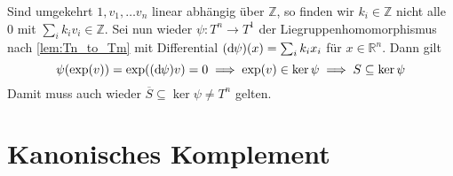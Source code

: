 \begin{beweis}
\begin{enumerate}[(i)]
		Sind umgekehrt $1, v_1, \ldots v_n$ linear abhängig über $\mathbb{Z}$, so finden wir $k_i \in \mathbb{Z}$ nicht alle $0$ mit $\sum_i k_i v_i \in \mathbb{Z}$.
		Sei nun wieder $\psi \colon T^n \to T^1$ der Liegruppenhomomorphismus nach \autoref{lem:Tn_to_Tm} mit Differential $(\mathrm{d}\mkern-1.0mu \psi) (x) = \sum_i k_i x_i$ für $x \in \mathbb{R}^n$.
		Dann gilt
		\[
			\psi \enbrace*{\exp(v)} = \exp \enbrace*{(\mathd \psi) v} = 0 \implies \exp(v) \in \ker \psi \implies S \subseteq \ker \psi
		\]
		Damit muss auch wieder $\overline{S} \subseteq \ker \psi \neq T^n$ gelten.\qedhere
	\end{enumerate}
\end{beweis}

\section{Kanonisches Komplement} %
\label{sec:kanonisches_komplement}

